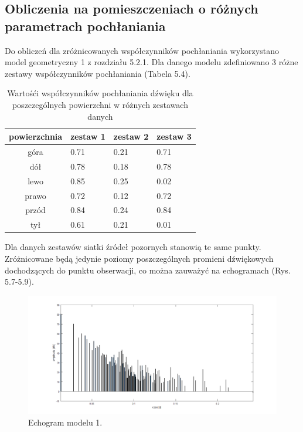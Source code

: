 \subsection{Obliczenia na pomieszczeniach o różnych parametrach pochłaniania}\label{sec:imstest2}

Do obliczeń dla zróżnicowanych współczynników pochłaniania wykorzystano model geometryczny 1 z rozdziału 5.2.1. Dla danego modelu zdefiniowano 3 różne zestawy współczynników pochłaniania (Tabela 5.4).

\begin{table}[h]
        \centering
        \begin{threeparttable}
                \caption{Wartośći współczynników pochłaniania dźwięku dla poszczególnych powierzchni w różnych zestawach danych}\label{tab:table_example}
                \begin{tabularx}{0.6\textwidth}{| c | X | X | X |}
                        \toprule
                        	powierzchnia &	zestaw 1 & zestaw 2 & zestaw 3 \\
                       \midrule
		góra & 0.71 & 0.21 & 0.71 \\
                        dół & 0.78 & 0.18 & 0.78 \\
		lewo & 0.85 & 0.25 & 0.02 \\
                     prawo & 0.72 & 0.12 & 0.72 \\
		przód & 0.84 & 0.24 & 0.84 \\
                    tył & 0.61 & 0.21 & 0.01 \\
                        \bottomrule
                \end{tabularx}
        \end{threeparttable}
\end{table}

Dla danych zestawów siatki źródeł pozornych stanowią te same punkty. Zróżnicowane będą jedynie poziomy poszczególnych promieni dźwiękowych dochodzących do punktu obserwacji, co można zauważyć na echogramach (Rys. 5.7-5.9).

\begin{figure}[h]
        \centering
                \centering
                \includegraphics[width=12cm]{echoz1}
	\caption{Echogram modelu 1.}
\end{figure}

